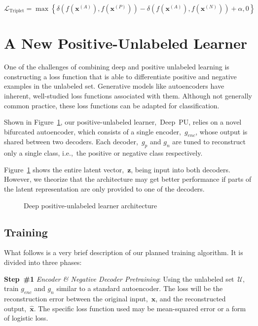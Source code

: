 \documentclass[10pt]{article}
\newcommand{\toolname}{Deep~PU}
\newcommand{\xI}[1]{\mathbf{x}^{(#1)}}
\newcommand{\puDist}[2]{\delta\left(#1, #2\right)}
\newcommand{\nnDist}[3]{\puDist{#1\left(#2\right)}{#1\left(#3\right)}}
\newcommand{\lTrip}{\mathcal{L}_{\text{Triplet}}}
\newcommand{\exA}{\xI{{A}}}
\newcommand{\exP}{\xI{{P}}}
\newcommand{\exN}{\xI{{N}}}
\begin{document}
  \begin{equation}\label{eq:TripletLoss}
    \lTrip = \max\left\{ \nnDist{f}{\exA}{\exP} - \nnDist{f}{\exA}{\exN} + \alpha, 0 \right\}
  \end{equation}

\section{A New Positive-Unlabeled Learner}\label{sec:DeepPU}

One of the challenges of combining deep and positive unlabeled learning is constructing a loss function that is able to differentiate positive and negative examples in the unlabeled set.  Generative models like autoencoders have inherent, well-studied loss functions associated with them.  Although not generally common practice, these loss functions can be adapted for classification.

Shown in Figure~\ref{fig:DeepPU}, our positive-unlabeled learner,~\toolname, relies on a novel bifurcated autoencoder, which consists of a single encoder,~$g_{enc}$, whose output is shared between two decoders.   Each decoder,~$g_{p}$ and $g_{n}$ are tuned to reconstruct only a single class, i.e.,~the positive or negative class respectively.

Figure~\ref{fig:DeepPU} shows the entire latent vector,~$\mathbf{z}$, being input into both decoders.  However, we theorize that the architecture may get better performance if parts of the latent representation are only provided to one of the decoders.

\begin{figure}[t]
  \centering
  
  \caption{Deep positive-unlabeled learner architecture}\label{fig:DeepPU}
\end{figure}

\subsection{Training}

What follows is a very brief description of our planned training algorithm.  It is divided into three phases:

\vspace{6pt}
\noindent
\textbf{Step~\#1} \textit{Encoder \& Negative Decoder Pretraining}: Using the unlabeled set~$\mathcal{U}$, train $g_{enc}$ and $g_{n}$ similar to a standard autoencoder.  The loss will be the reconstruction error between the original input,~$\mathbf{x}$, and the reconstructed output,~$\hat{\mathbf{x}}$.  The specific loss function used may be mean-squared error or a form of logistic loss.
\end{document}
